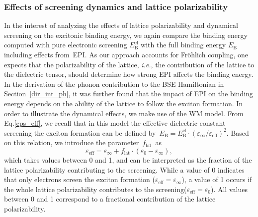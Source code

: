 \subsubsection{Effects of screening dynamics and lattice polarizability}\label{subsec_dyn_pol_effects}
In the interest of analyzing the effects of  lattice polarizability and dynamical screening  on the excitonic binding energy, we again compare the binding energy computed with pure electronic screening  $E_\text{B}^\text{el}$ with the full binding energy $E_\text{B}^{\phantom{l}}$ including effects from~EPI. As our approach accounts for Fr\"ohlich coupling, one expects that the polarizability of the lattice, \textit{i.e.}, the contribution of the lattice to the dielectric tensor, should determine how strong EPI affects the binding energy. In the derivation of the phonon contribution to the BSE Hamiltonian in Section~\ref{dir_int_ph}, it was further found that the impact of EPI on the binding energy depends on the ability of the lattice to follow the exciton formation. In order to illustrate the dynamical effects, we make use of the WM model. From Eq.\;\eqref{eps_eff}, we recall that in this model the effective dielectric constant screening the exciton formation can be defined by~$E_\text{B}^{\phantom{l}} = E^\text{el}_\text{B}\cdot(\varepsilon_\infty/\varepsilon_\text{eff})^2$. Based on this relation, we introduce the parameter~$f_\text{lat}$~as
%
\begin{equation}\label{flat}
    \varepsilon_\text{eff} = \varepsilon_\infty +f_\text{lat}\cdot(\varepsilon_0 - \varepsilon_\infty), 
\end{equation}
%
which takes values between 0 and 1, and can be interpreted as the fraction of the lattice polarizability contributing to the screening. While a value of 0 indicates that only electrons screen the exciton formation ($\varepsilon_\text{eff}=\varepsilon_\infty$), a value of 1 occurs if the whole lattice polarizability contributes to the screening($\varepsilon_\text{eff}=\varepsilon_0$). All values between 0 and 1 correspond to a fractional contribution of the lattice polarizability. 

